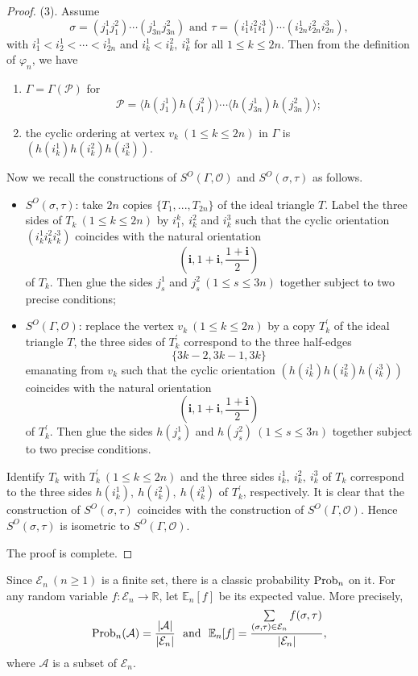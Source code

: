 \documentclass{amsart}
\theoremstyle{plain}
\theoremstyle{definition}
\theoremstyle{remark}
\begin{document}
\begin{proof}
(3). Assume
$$\sigma=\left(j_1^1j_1^2\right)\cdots(j_{3n}^1j_{3n}^2)\text{ and }\tau=\left(i_1^1i_1^2i_1^3\right)\cdots\left(i_{2n}^1i_{2n}^2i_{2n}^3\right),$$
with $i_1^1<i_2^1<\cdots<i_{2n}^1$ and $i_k^1<i_k^2,\ i_k^3$ for all $1\leq k\leq 2n$. Then from the definition of $\varphi_n$, we have 
\begin{enumerate}[label=(\roman*)]
    \item $\Gamma=\Gamma(\mathcal{P})$ for
    $$\mathcal{P}=\langle h(j_1^1)h(j_1^2)\rangle\cdots\langle h(j_{3n}^1)h(j_{3n}^2)\rangle;$$
    \item the cyclic ordering at vertex $v_k\ (1\leq k\leq 2n)$ in $\Gamma$ is $\left(h(i_k^1)h(i_k^2)h(i_k^3)\right).$
\end{enumerate}
Now we recall the constructions of $S^O(\Gamma,\mathcal{O})$ and $S^O(\sigma,\tau)$ as follows.
\begin{itemize}
    \item $S^O(\sigma,\tau)$: take $2n$ copies $\{T_1,...,T_{2n}\}$ of the ideal triangle $T$. Label the three sides of $T_k\ (1\leq k\leq 2n)$ by $i_1^k,\ i_k^2$ and $i_k^3$ such that the cyclic orientation $\left(i_k^1i_k^2i_k^3\right)$ coincides with the natural orientation $$\left(\textbf{i},1+\textbf{i},\frac{1+\textbf{i}}{2}\right)$$
of $T_k$. Then glue the sides $j_s^1$ and $j_s^2\ (1\leq s\leq 3n)$ together subject to two precise conditions;
\item $S^O(\Gamma,\mathcal{O})$: replace the vertex $v_k\ (1\leq k\leq 2n)$ by a copy $T_k^\prime$ of the ideal triangle $T$, the three sides of $T_k^\prime$ correspond to the three half-edges $$\{3k-2,3k-1,3k\}$$ emanating from $v_k$ such that the cyclic orientation $\left(h(i_k^1)h(i_k^2)h(i_k^3)\right)$ coincides with the natural orientation 
$$\left(\textbf{i},1+\textbf{i},\frac{1+\textbf{i}}{2}\right)$$
of $T_k^\prime$. Then glue the sides $h(j_s^1)$ and $h(j_s^2)\ (1\leq s\leq 3n)$ together subject to two precise conditions.
\end{itemize}
Identify $T_k$ with $T_k^\prime\ (1\leq k\leq 2n)$ and the three sides $i_k^1,\ i_k^2,\ i_k^3$ of $T_k$ correspond to the three sides $h(i_k^1),\ h(i_k^2),\ h(i_k^3)$ of $T_k^\prime$, respectively. It is clear that the construction of $S^O(\sigma,\tau)$ coincides with the construction of $S^O(\Gamma,\mathcal{O})$. Hence $S^O(\sigma,\tau)$ is isometric to $S^O(\Gamma,\mathcal{O})$.

The proof is complete.
\end{proof}

Since $\mathcal{E}_n\ (n\geq 1)$ is a finite set, there is a classic probability $\textnormal{Prob}_n$ on it. For any random variable $f:\mathcal{E}_n\to\mathbb{R}$, let $\mathbb{E}_n[f]$ be its expected value. More precisely, 
$$\textnormal{Prob}_n(\mathcal{A})=\frac{|\mathcal{A}|}{|\mathcal{E}_n|}\text{ \ and \ }\mathbb{E}_n[f]=\frac{\sum\limits_{(\sigma,\tau)\in\mathcal{E}_n}f(\sigma,\tau)}{|\mathcal{E}_n|},$$
where $\mathcal{A}$ is a subset of $\mathcal{E}_n$. 
\end{document}
